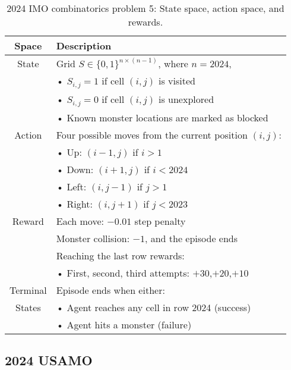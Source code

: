 \begin{table}[htb]
\caption{2024 IMO combinatorics problem 5: State space, action space, and rewards.}
  \centering
  \small
  \begin{tabular}{cl}
    \toprule
    Space    & Description \\
    \midrule
    State    & Grid \( S \in \{0,1\}^{n \times (n-1)} \), where $n=2024$,\\
             & • \( S_{i,j} = 1 \) if cell \( (i,j) \) is visited \\
             & • \( S_{i,j} = 0 \) if cell \( (i,j) \) is unexplored \\
             & • Known monster locations are marked as blocked \\
    Action   & Four possible moves from the current position \( (i,j) \): \\
             & • Up: \( (i-1,j) \) if \( i > 1 \) \\
             & • Down: \( (i+1,j) \) if \( i < 2024 \) \\
             & • Left: \( (i,j-1) \) if \( j > 1 \) \\
             & • Right: \( (i,j+1) \) if \( j < 2023 \) \\
    Reward   & Each move: \( -0.01 \) step penalty \\
             & Monster collision: \( -1 \), and the episode ends \\
             & Reaching the last row rewards: \\
             & • First, second, third attempts: $+30$,$+20$,$+10$\\
    Terminal & Episode ends when either: \\
    States   & • Agent reaches any cell in row 2024 (success) \\
             & • Agent hits a monster (failure) \\
    \bottomrule
    
  \end{tabular}  
\end{table}

\newpage
\clearpage

\subsection*{2024 USAMO}
\label{appendix:F_2024_USAMO}

